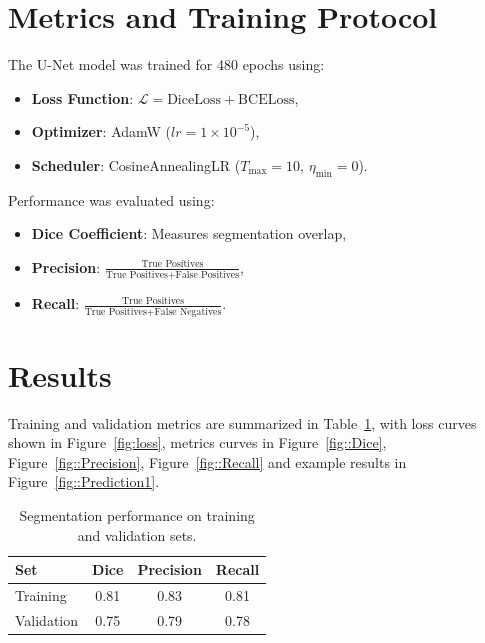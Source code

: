 \section{Metrics and Training Protocol}  
The U-Net model was trained for 480 epochs using:  
\begin{itemize}  
    \item \textbf{Loss Function}: \(\mathcal{L} = \text{DiceLoss} + \text{BCELoss}\),  
    \item \textbf{Optimizer}: AdamW (\(lr = 1 \times 10^{-5}\)),  
    \item \textbf{Scheduler}: CosineAnnealingLR (\(T_{\text{max}} = 10\), \(\eta_{\text{min}} = 0\)).  
\end{itemize}  
Performance was evaluated using:  
\begin{itemize}  
    \item \textbf{Dice Coefficient}: Measures segmentation overlap,  
    \item \textbf{Precision}: \(\frac{\text{True Positives}}{\text{True Positives} + \text{False Positives}}\),  
    \item \textbf{Recall}: \(\frac{\text{True Positives}}{\text{True Positives} + \text{False Negatives}}\).  
\end{itemize}  

\section{Results}  
Training and validation metrics are summarized in Table~\ref{tab:metrics}, with loss curves shown in Figure~\ref{fig:loss}, metrics curves in Figure~\ref{fig::Dice}, Figure~\ref{fig::Precision}, Figure~\ref{fig::Recall} and example results in Figure~\ref{fig::Prediction1}.  
\begin{table}[ht]  
    \centering  
    \caption{Segmentation performance on training and validation sets.}  
    \label{tab:metrics}  
    \begin{tabular}{lccc}  
        \toprule  
        \textbf{Set} & \textbf{Dice} & \textbf{Precision} & \textbf{Recall} \\  
        \midrule  
        Training & 0.81 & 0.83 & 0.81 \\  
        Validation & 0.75 & 0.79 & 0.78 \\  
        \bottomrule  
    \end{tabular}  
\end{table}  

